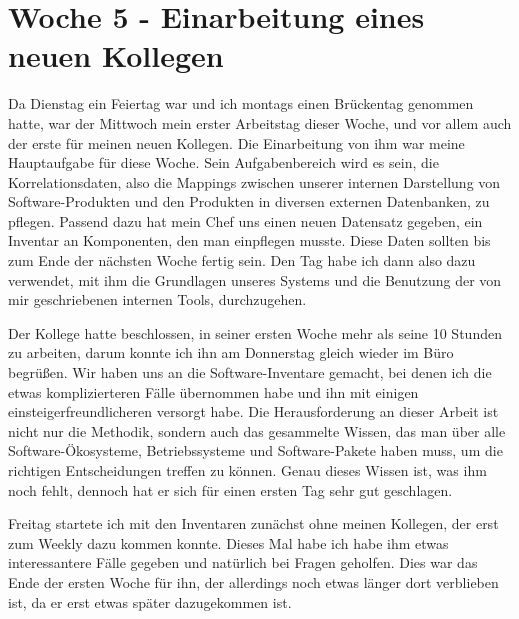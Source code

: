 \section{Woche 5 - Einarbeitung eines neuen Kollegen} \label{sec:bericht-wo-5-initial}


\lweekdaymarginpar{\weekdayWednesdayLong}

Da Dienstag ein Feiertag war und ich montags einen Brückentag genommen hatte, war der Mittwoch mein erster Arbeitstag dieser Woche, und vor allem auch der erste für meinen neuen Kollegen.
Die Einarbeitung von ihm war meine Hauptaufgabe für diese Woche.
Sein Aufgabenbereich wird es sein, die Korrelationsdaten, also die Mappings zwischen unserer internen Darstellung von Software-Produkten und den Produkten in diversen externen Datenbanken, zu pflegen.
Passend dazu hat mein Chef uns einen neuen Datensatz gegeben, ein Inventar an Komponenten, den man einpflegen musste.
Diese Daten sollten bis zum Ende der nächsten Woche fertig sein.
Den Tag habe ich dann also dazu verwendet, mit ihm die Grundlagen unseres Systems und die Benutzung der von mir geschriebenen internen Tools, durchzugehen.

\sweekdaymarginpar{\weekdayThursdayLong}

Der Kollege hatte beschlossen, in seiner ersten Woche mehr als seine 10 Stunden zu arbeiten, darum konnte ich ihn am Donnerstag gleich wieder im Büro begrüßen.
Wir haben uns an die Software-Inventare gemacht, bei denen ich die etwas komplizierteren Fälle übernommen habe und ihn mit einigen einsteigerfreundlicheren versorgt habe.
Die Herausforderung an dieser Arbeit ist nicht nur die Methodik, sondern auch das gesammelte Wissen, das man über alle Software-Ökosysteme, Betriebssysteme und Software-Pakete haben muss, um die richtigen Entscheidungen treffen zu können.
Genau dieses Wissen ist, was ihm noch fehlt, dennoch hat er sich für einen ersten Tag sehr gut geschlagen.

\sweekdaymarginpar{\weekdayFridayLong}

Freitag startete ich mit den Inventaren zunächst ohne meinen Kollegen, der erst zum Weekly dazu kommen konnte.
Dieses Mal habe ich habe ihm etwas interessantere Fälle gegeben und natürlich bei Fragen geholfen.
Dies war das Ende der ersten Woche für ihn, der allerdings noch etwas länger dort verblieben ist, da er erst etwas später dazugekommen ist.
